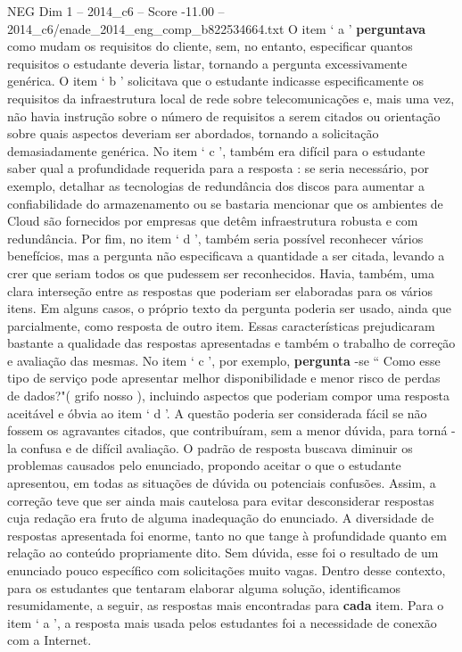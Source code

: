 \begin{textsample}{NEG Dim 1 – 2014\_c6 – Score -11.00 – 2014\_c6/enade\_2014\_eng\_comp\_b822534664.txt}
O item ‘ a ’ \textbf{perguntava} como mudam os requisitos do cliente, sem, no entanto, especificar quantos requisitos o estudante deveria listar, tornando a pergunta excessivamente genérica.
O item ‘ b ’ solicitava que o estudante indicasse especificamente os requisitos da infraestrutura local de rede sobre telecomunicações e, mais uma vez, não havia instrução sobre o número de requisitos a serem citados ou orientação sobre quais aspectos deveriam ser abordados, tornando a solicitação demasiadamente genérica.
No item ‘ c ’, também era difícil para o estudante saber qual a profundidade requerida para a resposta : se seria necessário, por exemplo, detalhar as tecnologias de redundância dos discos para aumentar a confiabilidade do armazenamento ou se bastaria mencionar que os ambientes de Cloud são fornecidos por empresas que detêm infraestrutura robusta e com redundância.
Por fim, no item ‘ d ’, também seria possível reconhecer vários benefícios, mas a pergunta não especificava a quantidade a ser citada, levando a crer que seriam todos os que pudessem ser reconhecidos.
Havia, também, uma clara interseção entre as respostas que poderiam ser elaboradas para os vários itens.
Em alguns casos, o próprio texto da pergunta poderia ser usado, ainda que parcialmente, como resposta de outro item.
Essas características prejudicaram bastante a qualidade das respostas apresentadas e também o trabalho de correção e avaliação das mesmas.
No item ‘ c ’, por exemplo, \textbf{pergunta} -se “ Como esse tipo de serviço pode apresentar melhor disponibilidade e menor risco de perdas de dados?"( grifo nosso ), incluindo aspectos que poderiam compor uma resposta aceitável e óbvia ao item ‘ d ’.
A questão poderia ser considerada fácil se não fossem os agravantes citados, que contribuíram, sem a menor dúvida, para torná -la confusa e de difícil avaliação.
O padrão de resposta buscava diminuir os problemas causados pelo enunciado, propondo aceitar o que o estudante apresentou, em todas as situações de dúvida ou potenciais confusões.
Assim, a correção teve que ser ainda mais cautelosa para evitar desconsiderar respostas cuja redação era fruto de alguma inadequação do enunciado.
A diversidade de respostas apresentada foi enorme, tanto no que tange à profundidade quanto em relação ao conteúdo propriamente dito.
Sem dúvida, esse foi o resultado de um enunciado pouco específico com solicitações muito vagas.
Dentro desse contexto, para os estudantes que tentaram elaborar alguma solução, identificamos resumidamente, a seguir, as respostas mais encontradas para \textbf{cada} item.
Para o item ‘ a ’, a resposta mais usada pelos estudantes foi a necessidade de conexão com a Internet.

\end{textsample}
